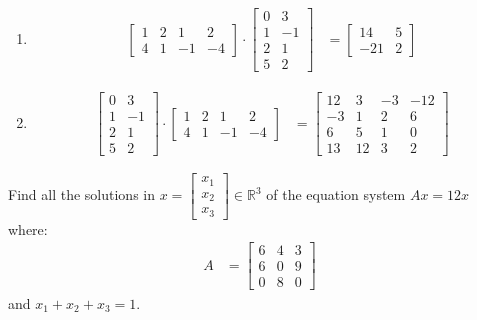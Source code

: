 \documentclass[final,expand]{problemset}
\begin{document}
{\begin{enumerate}
		\item \begin{align*}
			\begin{bmatrix}
				1 & 2 & 1 & 2\\ 4 & 1 & -1 & -4
			\end{bmatrix} \cdot \begin{bmatrix}
				 0 & 3\\ 1 & -1\\ 2 & 1 \\ 5 & 2
			\end{bmatrix} &= \begin{bmatrix}
				14 & 5\\ -21 & 2
			\end{bmatrix}
		\end{align*}

		\item \begin{align*}
			\begin{bmatrix}
				0 & 3\\ 1 & -1\\ 2 & 1 \\ 5 & 2
		   \end{bmatrix} \cdot \begin{bmatrix}
			1 & 2 & 1 & 2\\ 4 & 1 & -1 & -4
		\end{bmatrix} &= \begin{bmatrix}
			12 & 3 & -3 & -12\\
			-3 & 1 & 2 & 6\\
			6 & 5 & 1 & 0\\
			13 & 12 & 3 & 2
		\end{bmatrix}
		\end{align*}
	\end{enumerate}
}

\problem Find all the solutions in $x = \begin{bmatrix} x_1 \\ x_2\\ x_3\end{bmatrix} \in \mathbb{R}^3$ of the equation system $Ax = 12x$ where:
\begin{align*}
	A &= \begin{bmatrix}
		6 & 4 & 3\\ 6 & 0 & 9\\ 0 & 8 & 0
	\end{bmatrix}
\end{align*}
and $x_1 + x_2 + x_3 = 1$.
\end{document}
